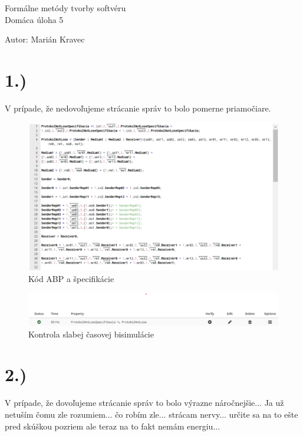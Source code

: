 \documentclass[a4paper]{article}
\begin{document}
 
	
\pagestyle{plain}

\begin{center}
	\sc\large
	Formálne metódy tvorby softvéru\\
	Domáca úloha 5
\end{center}

Autor: Marián Kravec

\section{1.)}

V prípade, že nedovoľujeme strácanie správ to bolo pomerne priamočiare.

\begin{figure}[!h]
	\centering
	\includegraphics[width=1\textwidth]{lose_code.png}
	\caption{Kód ABP a špecifikácie}
\end{figure}

\begin{figure}[!h]
	\centering
	\includegraphics[width=1\textwidth]{lose_test.png}
	\caption{Kontrola slabej časovej bisimulácie}
\end{figure}
\newpage

\section{2.)}

V prípade, že dovoľujeme strácanie správ to bolo výrazne náročnejšie... Ja už netuším čomu zle rozumiem... čo robím zle... strácam nervy... určite sa na to ešte pred skúškou pozriem ale teraz na to fakt nemám energiu...
\end{document}
